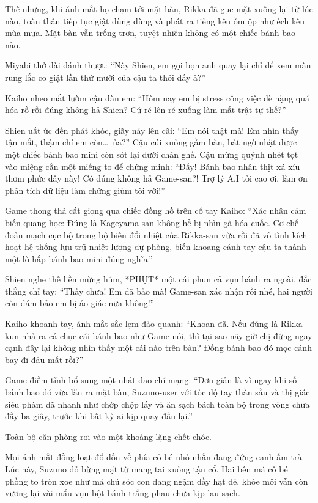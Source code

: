 \documentclass[../main.tex]{subfiles}
\begin{document}
Thế nhưng, khi ánh mắt họ chạm tới mặt bàn, Rikka đã gục mặt xuống lại từ lúc nào, toàn thân tiếp tục giật đùng đùng và phát ra tiếng kêu ồm ộp như ếch kêu mùa mưa. Mặt bàn vẫn trống trơn, tuyệt nhiên không có một chiếc bánh bao nào.

Miyabi thở dài đánh thượt: ``Này Shien, em gọi bọn anh quay lại chỉ để xem màn rung lắc co giật lần thứ mười của cậu ta thôi đấy à?''

Kaiho nheo mắt lườm cậu đàn em: ``Hôm nay em bị stress công việc đè nặng quá hóa rồ rồi đúng không hả Shien? Cứ ré lên ré xuống làm mất trật tự thế?''

Shien uất ức đến phát khóc, giãy nảy lên cãi: ``Em nói thật mà! Em nhìn thấy tận mắt, thậm chí em còn\dots\ ủa?'' Cậu cúi xuống gầm bàn, bất ngờ nhặt được một chiếc bánh bao mini còn sót lại dưới chân ghế. Cậu mừng quýnh nhét tọt vào miệng cắn một miếng to để chứng minh: ``Đấy! Bánh bao nhân thịt xá xíu thơm phức đây này! Có đúng không hả Game-san?! Trợ lý A.I tối cao ơi, làm ơn phân tích dữ liệu làm chứng giùm tôi với!''

Game thong thả cất giọng qua chiếc đồng hồ trên cổ tay Kaiho: ``Xác nhận cảm biến quang học: Đúng là Kageyama-san không hề bị nhìn gà hóa cuốc. Cơ chế đoản mạch cục bộ trong bộ biến đổi nhiệt của Rikka-san vừa rồi đã vô tình kích hoạt hệ thống lưu trữ nhiệt lượng dự phòng, biến khoang cánh tay cậu ta thành một lò hấp bánh bao mini đúng nghĩa.''

Shien nghe thế liền mừng húm, *PHỤT* một cái phun cả vụn bánh ra ngoài, đắc thắng chỉ tay: ``Thấy chưa! Em đã bảo mà! Game-san xác nhận rồi nhé, hai người còn dám bảo em bị ảo giác nữa không!''

Kaiho khoanh tay, ánh mắt sắc lẹm đảo quanh: ``Khoan đã. Nếu đúng là Rikka-kun nhả ra cả chục cái bánh bao như Game nói, thì tại sao nãy giờ chị đứng ngay cạnh đây lại không nhìn thấy một cái nào trên bàn? Đống bánh bao đó mọc cánh bay đi đâu mất rồi?''

Game điềm tĩnh bổ sung một nhát dao chí mạng: ``Đơn giản là vì ngay khi số bánh bao đó vừa lăn ra mặt bàn, Suzuno-user với tốc độ tay thần sầu và thị giác siêu phàm đã nhanh như chớp chộp lấy và ăn sạch bách toàn bộ trong vòng chưa đầy ba giây, trước khi bất kỳ ai kịp quay đầu lại.''

Toàn bộ căn phòng rơi vào một khoảng lặng chết chóc.

Mọi ánh mắt đồng loạt đổ dồn về phía cô bé nhỏ nhắn đang đứng cạnh ấm trà. Lúc này, Suzuno đỏ bừng mặt từ mang tai xuống tận cổ. Hai bên má cô bé phồng to tròn xoe như má chú sóc con đang ngậm đầy hạt dẻ, khóe môi vẫn còn vương lại vài mẩu vụn bột bánh trắng phau chưa kịp lau sạch.
\end{document}
